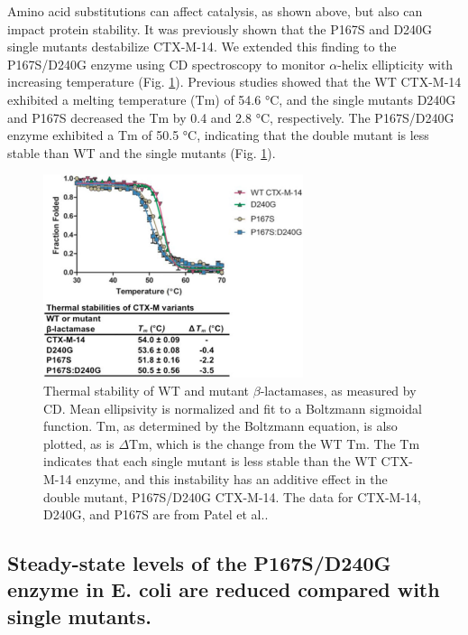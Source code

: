 \documentclass[../main.tex]{subfiles}
\begin{document}
        Amino acid substitutions can affect catalysis, as shown above, but also can impact protein stability. It was previously shown that the P167S and D240G single mutants destabilize CTX-M-14\cite{patel_characterization_2015}. We extended this finding to the P167S/D240G enzyme using CD spectroscopy to monitor $\alpha$-helix ellipticity with increasing temperature (Fig. \ref{fig:ch2-fig3}). Previous studies showed that the WT CTX-M-14 exhibited a melting temperature (Tm) of 54.6 °C, and the single mutants D240G and P167S decreased the Tm by 0.4 and 2.8 °C, respectively\cite{patel_characterization_2015}. The P167S/D240G enzyme exhibited a Tm of 50.5 °C, indicating that the double mutant is less stable than WT and the single mutants (Fig. \ref{fig:ch2-fig3}).

        \begin{figure}[!htb] %
            \centering
            \includegraphics[width=3in]{ch2-fig3.jpg}
            \caption[Thermal stability of WT and mutant $\beta$-lactamases, as measured by CD.]
                {Thermal stability of WT and mutant $\beta$-lactamases, as measured by CD. Mean ellipsivity is normalized and fit to a Boltzmann sigmoidal function. Tm, as determined by the Boltzmann equation, is also plotted, as is $\Delta$Tm, which is the change from the WT Tm. The Tm indicates that each single mutant is less stable than the WT CTX-M-14 enzyme, and this instability has an additive effect in the double mutant, P167S/D240G CTX-M-14. The data for CTX-M-14, D240G, and P167S are from Patel et al.\cite{patel_characterization_2015}.}
            \label{fig:ch2-fig3}
        \end{figure}

    \subsection{Steady-state levels of the P167S/D240G enzyme in E. coli are reduced compared with single mutants.}
\end{document}
